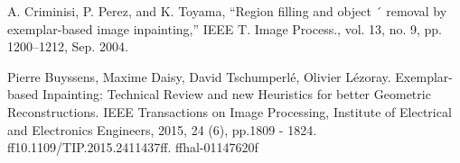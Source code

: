 \documentclass[conference]{IEEEtran}
\begin{document}


\begin{thebibliography}{00}
 A. Criminisi, P. Perez, and K. Toyama, “Region filling and object ´
removal by exemplar-based image inpainting,” IEEE T. Image Process.,
vol. 13, no. 9, pp. 1200–1212, Sep. 2004.

 Pierre Buyssens, Maxime Daisy, David Tschumperlé, Olivier Lézoray. Exemplar-based Inpainting:
Technical Review and new Heuristics for better Geometric Reconstructions. IEEE Transactions on
Image Processing, Institute of Electrical and Electronics Engineers, 2015, 24 (6), pp.1809 - 1824.
ff10.1109/TIP.2015.2411437ff. ffhal-01147620f
\end{thebibliography}
\end{document}
